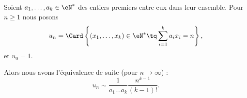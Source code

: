 \begin{proposition}     \label{PropWUFpuBR}
    Soient \( a_1,\ldots, a_k\in \eN^*\) des entiers premiers entre eux dans leur ensemble. Pour \( n\geq 1\) nous posons
    \begin{equation}
        u_n=\Card\left\{  (x_1,\ldots, x_k)\in \eN^*\tq \sum_{i=1}^ka_ix_i=n \right\},
    \end{equation}
    et \( u_0=1\).

    Alors nous avons l'équivalence de suite (pour \( n\to \infty\)) :
    \begin{equation}
        u_n\sim\frac{1}{ a_1\ldots a_k }\frac{ n^{k-1} }{ (k-1)! }.
    \end{equation}
\end{proposition}

